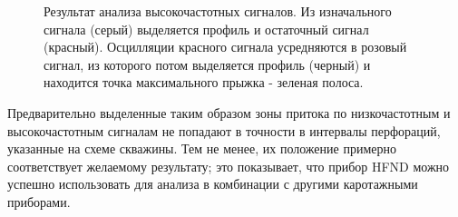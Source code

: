 \begin{figure}[H]
\centering
{}
\vfil\vskip -20pt
\vfil\vskip -20pt
\caption{Результат анализа высокочастотных сигналов. Из изначального сигнала (серый) выделяется профиль и остаточный сигнал (красный). Осцилляции красного сигнала усредняются в розовый сигнал, из которого потом выделяется профиль (черный) и находится точка максимального прыжка - зеленая полоса.}
\label{fig:hfnd_high}
\end{figure}

\par
Предварительно выделенные таким образом зоны притока по низкочастотным и высокочастотным сигналам не попадают в точности в интервалы перфораций, указанные на схеме скважины. Тем не менее, их положение примерно соответствует желаемому результату; это показывает, что прибор HFND можно успешно использовать для анализа в комбинации с другими каротажными приборами.